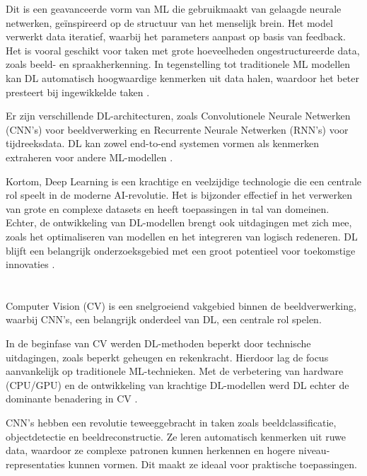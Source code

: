 Dit is een geavanceerde vorm van ML die gebruikmaakt van gelaagde neurale netwerken, geïnspireerd op de structuur van het menselijk brein.
Het model verwerkt data iteratief, waarbij het parameters aanpast op basis van feedback.  
Het is vooral geschikt voor taken met grote hoeveelheden ongestructureerde data, zoals beeld- en spraakherkenning. 
In tegenstelling tot traditionele ML modellen kan DL automatisch hoogwaardige kenmerken uit data halen, waardoor het beter presteert bij ingewikkelde taken \autocite{SharifaniEtAl2023}.

Er zijn verschillende DL-architecturen, zoals Convolutionele Neurale Netwerken (CNN's) voor beeldverwerking en Recurrente Neurale Netwerken (RNN's) voor tijdreeksdata. 
DL kan zowel end-to-end systemen vormen als kenmerken extraheren voor andere ML-modellen \autocite{JanieschEtAl2021}. 

Kortom, Deep Learning is een krachtige en veelzijdige technologie die een centrale rol speelt in de moderne AI-revolutie. 
Het is bijzonder effectief in het verwerken van grote en complexe datasets en heeft toepassingen in tal van domeinen. 
Echter, de ontwikkeling van DL-modellen brengt ook uitdagingen met zich mee, zoals het optimaliseren van modellen en het integreren van logisch redeneren. 
DL blijft een belangrijk onderzoeksgebied met een groot potentieel voor toekomstige innovaties \autocite{JiangEtAl2022}.

\section{}%
\label{sec:computer-vision}

Computer Vision (CV) is een snelgroeiend vakgebied binnen de beeldverwerking, waarbij CNN's, een belangrijk onderdeel van DL, een centrale rol spelen.  

In de beginfase van CV werden DL-methoden beperkt door technische uitdagingen, zoals beperkt geheugen en rekenkracht. 
Hierdoor lag de focus aanvankelijk op traditionele ML-technieken. 
Met de verbetering van hardware (CPU/GPU) en de ontwikkeling van krachtige DL-modellen werd DL echter de dominante benadering in CV \autocite{ChaiEtAl2021}.

CNN's hebben een revolutie teweeggebracht in taken zoals beeldclassificatie, objectdetectie en beeldreconstructie. 
Ze leren automatisch kenmerken uit ruwe data, waardoor ze complexe patronen kunnen herkennen en hogere niveau-representaties kunnen vormen. 
Dit maakt ze ideaal voor praktische toepassingen. 

